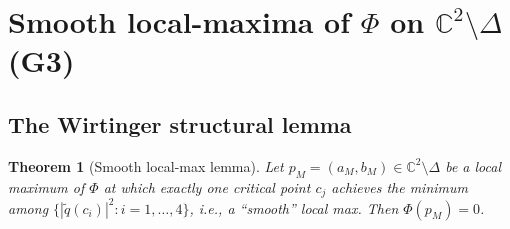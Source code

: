 \documentclass[11pt,a4paper]{article}
\newtheorem{theorem}{Theorem}[section]
\begin{document}
\section{Smooth local-maxima of $\Phi$ on $\mathbb{C}^2\setminus\Delta$ (G3)}
\label{sec:G3}

\subsection{The Wirtinger structural lemma}

\begin{theorem}[Smooth local-max lemma]\label{thm:smooth-lemma}
Let $p_M = (a_M,b_M)\in\mathbb{C}^2\setminus\Delta$ be a local
maximum of $\Phi$ at which exactly one critical point $c_j$ achieves
the minimum among $\{|\widetilde q(c_i)|^2 : i=1,\dots,4\}$, i.e., a
``smooth'' local max. Then $\Phi(p_M)=0$.
\end{theorem}
\end{document}
